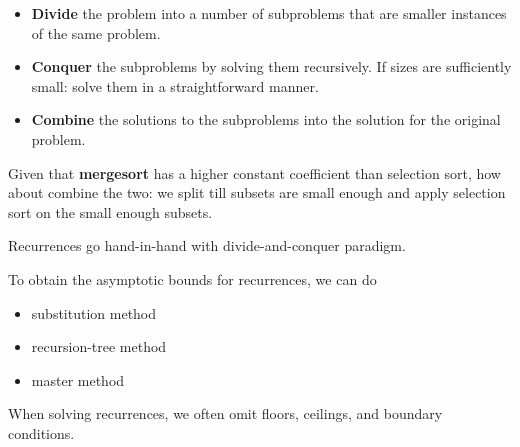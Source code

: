 \documentclass{article}
\begin{document}
\begin{itemize}
  \item \textbf{Divide} the problem into a number of subproblems that are smaller instances of the same problem.
  \item \textbf{Conquer} the subproblems by solving them recursively. If sizes are sufficiently small: solve them in a straightforward manner.
  \item \textbf{Combine} the solutions to the subproblems into the solution for the original problem.
\end{itemize}

Given that \textbf{mergesort} has a higher constant coefficient than selection sort, how about combine the two:
we split till subsets are small enough and apply selection sort on the small enough subsets.

Recurrences go hand-in-hand with divide-and-conquer paradigm.

To obtain the asymptotic bounds for recurrences, we can do
\begin{itemize}
  \item substitution method
  \item recursion-tree method
  \item master method
\end{itemize}
When solving recurrences, we often omit floors, ceilings, and boundary conditions.
\end{document}
